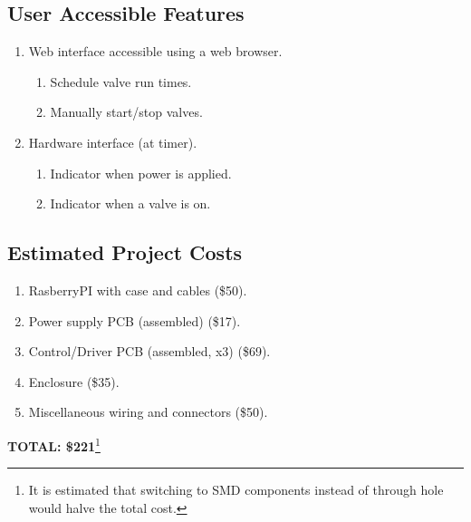 \documentclass[12pt,letterpaper]{article}
\begin{document}

\begin{samepage}
\section{User Accessible Features}

\begin{enumerate}
\item Web interface accessible using a web browser.
	\begin{enumerate}
	\item Schedule valve run times.
	\item Manually start/stop valves.
	\end{enumerate}
\item Hardware interface (at timer).
	\begin{enumerate}
	\item Indicator when power is applied.
	\item Indicator when a valve is on.
	\end{enumerate}
\end{enumerate}
\end{samepage}


\begin{samepage}
\section{Estimated Project Costs}

\begin{enumerate}
\item RasberryPI\autocite{rpi} with case and cables (\$50).
\item Power supply PCB (assembled) (\$17).
\item Control/Driver PCB (assembled, x3) (\$69).
\item Enclosure (\$35).
\item Miscellaneous wiring and connectors (\$50).
\end{enumerate}

\textbf{TOTAL: \$221}\footnote{It is estimated that switching
to SMD components instead of through hole would halve the total cost.}
\end{samepage}

\pagebreak
\printbibliography[heading=bibintoc]
\end{document}
